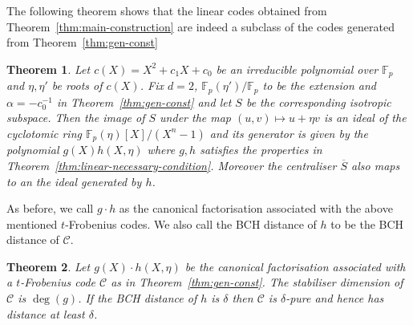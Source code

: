 \documentclass[conference]{IEEEtran}
\renewcommand{\=}{\approx}
\newcommand{\centraliser}[1]{\ensuremath{\overline{#1}}}
\newtheorem{theorem}{Theorem}[section]
\begin{document}
The following theorem shows that the linear codes obtained from Theorem~\ref{thm:main-construction} are indeed a subclass of the codes
generated from Theorem~\ref{thm:gen-const}
\begin{theorem}\label{thm:connection}
Let $c(X)=X^2+c_1X+c_0$ be an irreducible polynomial over $\mathbb{F}_p$ and $\eta,\eta'$ be roots of $c(X)$. Fix $d=2$, $\mathbb{F}_p(\eta')/\mathbb{F}_p$ to be the extension and $\alpha=-c_0^{-1}$ in Theorem~\ref{thm:gen-const} and let $S$ be the corresponding isotropic subspace. Then the image
of $S$ under the map $(u,v)\mapsto u+\eta v$ is an ideal of the cyclotomic
ring $\mathbb{F}_p(\eta)[X]/(X^n-1)$ and its generator is given by
the polynomial $g(X)h(X,\eta)$ where $g,h$ satisfies the properties in Theorem~\ref{thm:linear-necessary-condition}. Moreover the centraliser $\centraliser{S}$ also maps to an the ideal generated by $h$.
\end{theorem}

As before, we call $g\cdot h$ as the canonical factorisation associated with the above mentioned $t$-Frobenius codes. We also
call the BCH distance of $h$ to be the BCH distance of $\mathcal{C}$.

\begin{theorem}\label{thm:gen-prop}
Let $g(X)\cdot h(X,\eta)$ be the canonical factorisation associated with
a $t$-Frobenius code $\mathcal{C}$ as in Theorem~\ref{thm:gen-const}. The
stabiliser dimension of $\mathcal{C}$ is $\deg(g)$. If the BCH distance of $h$ is $\delta$ then $\mathcal{C}$ is $\delta$-pure and
hence has distance at least $\delta$. 
\end{theorem}
\end{document}
